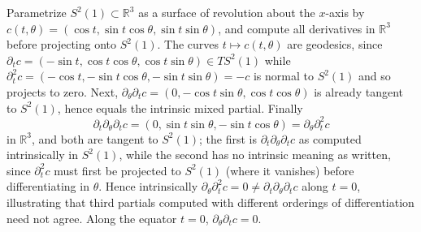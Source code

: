 \begin{example}
  \label{ex:pet-ch6-sphere-third-partials}
  Parametrize $S^2(1)\subset\mathbb{R}^3$ as a surface of revolution about the
  $x$-axis by $c(t,\theta)=(\cos t,\sin t\cos\theta,\sin t\sin\theta)$, and
  compute all derivatives in $\mathbb{R}^3$ before projecting onto $S^2(1)$. The
  curves $t\mapsto c(t,\theta)$ are geodesics, since
  $\partial_tc=(-\sin t,\cos t\cos\theta,\cos t\sin\theta)\in TS^2(1)$ while
  $\partial_t^2c=(-\cos t,-\sin t\cos\theta,-\sin t\sin\theta)=-c$ is normal to
  $S^2(1)$ and so projects to zero. Next,
  $\partial_\theta\partial_tc=(0,-\cos t\sin\theta,\cos t\cos\theta)$ is already
  tangent to $S^2(1)$, hence equals the intrinsic mixed partial. Finally
  \[
    \partial_t\partial_\theta\partial_tc=(0,\sin t\sin\theta,-\sin t\cos\theta)
    =\partial_\theta\partial_t^2c
  \]
  in $\mathbb{R}^3$, and both are tangent to $S^2(1)$; the first is
  $\partial_t\partial_\theta\partial_tc$ as computed intrinsically in $S^2(1)$,
  while the second has no intrinsic meaning as written, since $\partial_t^2c$
  must first be projected to $S^2(1)$ (where it vanishes) before differentiating
  in $\theta$. Hence intrinsically
  $\partial_\theta\partial_t^2c=0\ne\partial_t\partial_\theta\partial_tc$ along
  $t=0$, illustrating that third partials computed with different orderings of
  differentiation need not agree. Along the equator $t=0$,
  $\partial_\theta\partial_tc=0$.
\end{example}


